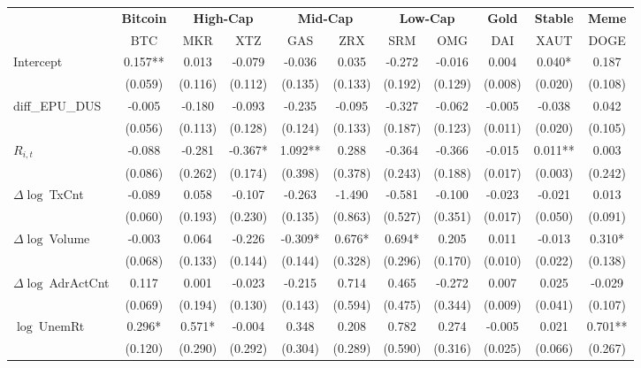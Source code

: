 \begin{table}[ht]
\centering
\scriptsize
\setlength{\tabcolsep}{4pt}
\begin{tabular}{l *{10}{c}}
\toprule
&\multicolumn{1}{c}{\textbf{Bitcoin}}&\multicolumn{2}{c}{\textbf{High-Cap}}&\multicolumn{2}{c}{\textbf{Mid-Cap}}&\multicolumn{2}{c}{\textbf{Low-Cap}}&\multicolumn{1}{c}{\textbf{Gold}}&\multicolumn{1}{c}{\textbf{Stable}}&\multicolumn{1}{c}{\textbf{Meme}}\\
\addlinespace
 & BTC & MKR & XTZ & GAS & ZRX & SRM & OMG & DAI & XAUT & DOGE \\
\midrule
Intercept & 0.157** & 0.013 & -0.079 & -0.036 & 0.035 & -0.272 & -0.016 & 0.004 & 0.040* & 0.187 \\
 & (0.059) & (0.116) & (0.112) & (0.135) & (0.133) & (0.192) & (0.129) & (0.008) & (0.020) & (0.108) \\
\addlinespace
diff_EPU_DUS & -0.005 & -0.180 & -0.093 & -0.235 & -0.095 & -0.327 & -0.062 & -0.005 & -0.038 & 0.042 \\
 & (0.056) & (0.113) & (0.128) & (0.124) & (0.133) & (0.187) & (0.123) & (0.011) & (0.020) & (0.105) \\
\addlinespace
$R_{i,t}$ & -0.088 & -0.281 & -0.367* & 1.092** & 0.288 & -0.364 & -0.366 & -0.015 & 0.011** & 0.003 \\
 & (0.086) & (0.262) & (0.174) & (0.398) & (0.378) & (0.243) & (0.188) & (0.017) & (0.003) & (0.242) \\
\addlinespace
$\Delta\log\ $TxCnt & -0.089 & 0.058 & -0.107 & -0.263 & -1.490 & -0.581 & -0.100 & -0.023 & -0.021 & 0.013 \\
 & (0.060) & (0.193) & (0.230) & (0.135) & (0.863) & (0.527) & (0.351) & (0.017) & (0.050) & (0.091) \\
\addlinespace
$\Delta\log\ $Volume & -0.003 & 0.064 & -0.226 & -0.309* & 0.676* & 0.694* & 0.205 & 0.011 & -0.013 & 0.310* \\
 & (0.068) & (0.133) & (0.144) & (0.144) & (0.328) & (0.296) & (0.170) & (0.010) & (0.022) & (0.138) \\
\addlinespace
$\Delta\log\ $AdrActCnt & 0.117 & 0.001 & -0.023 & -0.215 & 0.714 & 0.465 & -0.272 & 0.007 & 0.025 & -0.029 \\
 & (0.069) & (0.194) & (0.130) & (0.143) & (0.594) & (0.475) & (0.344) & (0.009) & (0.041) & (0.107) \\
\addlinespace
$\log\ $UnemRt & 0.296* & 0.571* & -0.004 & 0.348 & 0.208 & 0.782 & 0.274 & -0.005 & 0.021 & 0.701** \\
 & (0.120) & (0.290) & (0.292) & (0.304) & (0.289) & (0.590) & (0.316) & (0.025) & (0.066) & (0.267) \\

\end{tabular}
\end{table}
